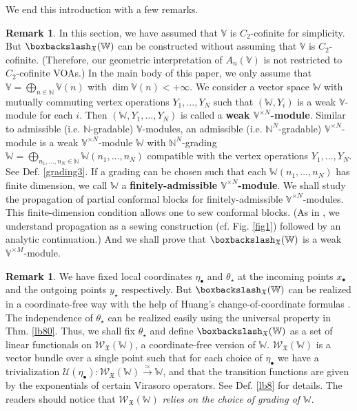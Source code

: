 \documentclass[11pt,b5paper,notitlepage]{article}
\theoremstyle{definition}
\newtheorem{rem}[df]{Remark}
\theoremstyle{plain}
\newcommand{\mc}{\mathcal}
\newcommand{\scr}{\mathscr}
\newcommand{\blt}{\bullet}
\newcommand{\Vbb}{\mathbb V}
\newcommand{\Wbb}{\mathbb W}
\newcommand{\Nbb}{\mathbb N}
\newcommand{\<}{\left\langle}
\renewcommand{\>}{\right\rangle}
\newcommand{\fx}{\mathfrak{X}}
\newcommand{\bbs}{\boxbackslash}
\numberwithin{equation}{subsection}
\begin{document}
We end this introduction with a few remarks.

\begin{rem}
In this section, we have assumed that $\Vbb$ is $C_2$-cofinite for simplicity. But $\bbs_\fx(\Wbb)$ can be constructed without assuming that $\Vbb$ is $C_2$-cofinite. (Therefore, our geometric interpretation of $A_n(\Vbb)$ is not restricted to $C_2$-cofinite VOAs.) In the main body of this paper, we only assume that $\Vbb=\bigoplus_{n\in\Nbb}\Vbb(n)$ with $\dim \Vbb(n)<+\infty$. We consider a vector space $\Wbb$ with mutually commuting vertex operations $Y_1,\dots,Y_N$ such that $(\Wbb,Y_i)$ is a weak $\Vbb$-module for each $i$. Then $(\Wbb, Y_1,\dots,Y_N)$ is called a \textbf{weak $\Vbb^{\times N}$-module}. Similar to admissible (i.e. $\Nbb$-gradable) $\Vbb$-modules, an admissible (i.e. $\Nbb^N$-gradable) $\Vbb^{\times N}$-module is a weak $\Vbb^{\times N}$-module $\Wbb$ with $\Nbb^N$-grading $\Wbb=\bigoplus_{n_1,\dots,n_N\in\Nbb}\Wbb(n_1,\dots,n_N)$ compatible with the vertex operations $Y_1,\dots,Y_N$. See Def. \ref{grading3}. If a grading can be chosen such that each $\Wbb(n_1,\dots,n_N)$ has finite dimension, we call $\Wbb$ a \textbf{finitely-admissible $\Vbb^{\times N}$-module}. We shall study the propagation of partial conformal blocks for finitely-admissible $\Vbb^{\times N}$-modules. This finite-dimension condition allows one to sew conformal blocks. (As in \cite{Gui-propagation}, we understand propagation as a sewing construction (cf. Fig. \ref{fig1}) followed by an analytic continuation.) And we shall prove that $\bbs_\fx(\Wbb)$ is a weak $\Vbb^{\times M}$-module. 
\end{rem}

\begin{rem}
We have fixed local coordinates $\eta_\blt$ and $\theta_\star$ at the incoming points $x_\blt$ and the outgoing points $y_\star$ respectively. But $\bbs_\fx(\Wbb)$ can be realized in a coordinate-free way with the help of Huang's change-of-coordinate formulas \cite{Hua97}. The independence of $\theta_\star$ can be realized easily using the universal property in Thm. \ref{lb80}. Thus, we shall fix $\theta_\star$ and define $\bbs_\fx(\Wbb)$ as a set of linear functionals on $\scr W_\fx(\Wbb)$, a coordinate-free version of $\Wbb$. $\scr W_\fx(\Wbb)$ is a vector bundle over a single point such that for each choice of $\eta_\blt$ we have a trivialization $\mc U(\eta_\blt):\scr W_\fx(\Wbb)\xrightarrow{\simeq}\Wbb$, and that the transition functions are given by the exponentials of certain Virasoro operators. See Def. \ref{lb8} for details. The readers should notice that $\scr W_\fx(\Wbb)$ \emph{relies on the choice of grading of $\Wbb$}.
\end{rem}
\end{document}

